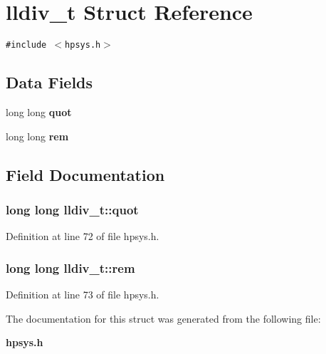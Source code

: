 \section{lldiv\_\-t Struct Reference}
\label{structlldiv__t}
{\tt \#include $<$hpsys.h$>$}

\subsection*{Data Fields}
\begin{CompactItemize}
\item 
long long {\bf quot}
\item 
long long {\bf rem}
\end{CompactItemize}


\subsection{Field Documentation}
\subsubsection{\setlength{\rightskip}{0pt plus 5cm}long long lldiv\_\-t::quot}\label{structlldiv__t_m0}




Definition at line 72 of file hpsys.h.
\subsubsection{\setlength{\rightskip}{0pt plus 5cm}long long lldiv\_\-t::rem}\label{structlldiv__t_m1}




Definition at line 73 of file hpsys.h.

The documentation for this struct was generated from the following file:\begin{CompactItemize}
\item 
{\bf hpsys.h}\end{CompactItemize}
